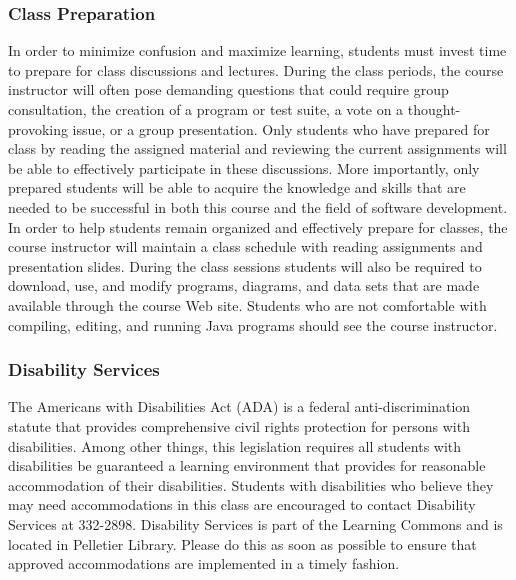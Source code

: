 \subsubsection*{Class Preparation}

% 

In order to minimize confusion and maximize learning, students must invest time to prepare for class discussions and
lectures.  During the class periods, the course instructor will often pose demanding questions that could require group
consultation, the creation of a program or test suite, a vote on a thought-provoking issue, or a group presentation.
Only students who have prepared for class by reading the assigned material and reviewing the current assignments will be
able to effectively participate in these discussions.  More importantly, only prepared students will be able to acquire
the knowledge and skills that are needed to be successful in both this course and the field of software development.  In
order to help students remain organized and effectively prepare for classes, the course instructor will maintain a class
schedule with reading assignments and presentation slides.   During the class sessions students will also be required to
download, use, and modify programs, diagrams, and data sets that are made available through the course Web site.
Students who are not comfortable with compiling, editing, and running Java programs should see the course instructor.

\subsubsection*{Disability Services}

The Americans with Disabilities Act (ADA) is a federal anti-discrimination statute that provides comprehensive civil
rights protection for persons with disabilities.  Among other things, this legislation requires all students with
disabilities be guaranteed a learning environment that provides for reasonable accommodation of their disabilities.
Students with disabilities who believe they may need accommodations in this class are encouraged to contact Disability
Services at 332-2898.  Disability Services is part of the Learning Commons and is located in Pelletier Library.
Please do this as soon as possible to ensure that approved accommodations are implemented in a timely fashion.

